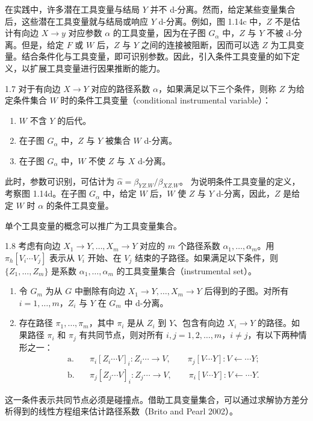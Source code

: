 在实践中，许多潜在工具变量与结局 $Y$ 并不 d-分离。然而，给定某些变量集合后，这些潜在工具变量就与结局或响应 $Y$ d-分离。例如，图 1.14c 中，$Z$ 不是估计有向边 $X\to y$ 对应参数 $\alpha$ 的工具变量，因为在子图 $G_\alpha$ 中，$Z$ 与 $Y$ 不被 d-分离。但是，给定 $F$ 或 $W$ 后，$Z$ 与 $Y$ 之间的连接被阻断，因而可以选 $Z$ 为工具变量。结合条件化与工具变量，即可识别参数。因此，引入条件工具变量的如下定义，以扩展工具变量进行因果推断的能力。

\begin{bookdefinition}{1.7}
对于有向边 $X\to Y$ 对应的路径系数 $\alpha$，如果满足以下三个条件，则称 $Z$ 为给定条件集合 $W$ 时的条件工具变量（conditional instrumental variable）：
\begin{enumerate}
\item $W$ 不含 $Y$ 的后代。
\item 在子图 $G_\alpha$ 中，$Z$ 与 $Y$ 被集合 $W$ d-分离。
\item 在子图 $G_\alpha$ 中，$W$ 不使 $Z$ 与 $X$ d-分离。
\end{enumerate}
此时，参数可识别，可估计为
$\widehat\alpha=\beta_{YZ.W}/\beta_{XZ.W}$。
为说明条件工具变量的定义，考察图 1.14d。在子图 $G_\alpha$ 中，给定 $W$ 后，$W$ 使 $Z$ 与 $Y$ d-分离，因此，$Z$ 是给定 $W$ 时 $\alpha$ 的条件工具变量。
\end{bookdefinition}

单个工具变量的概念可以推广为工具变量集合。

\begin{bookdefinition}{1.8}
考虑有向边 $X_1\to Y,\ldots,X_m\to Y$ 对应的 $m$ 个路径系数 $\alpha_1,\ldots,\alpha_m$。用 $\pi_h[V_i\cdots V_j]$ 表示从 $V_i$ 开始、在 $V_j$ 结束的子路径。如果满足以下条件，则 $\{Z_1,\ldots,Z_m\}$ 是系数 $\alpha_1,\ldots,\alpha_m$ 的工具变量集合（instrumental set）。
\begin{enumerate}
\item 令 $G_m$ 为从 $G$ 中删除有向边 $X_1\to Y,\ldots,X_m\to Y$ 后得到的子图。对所有 $i=1,\ldots,m$，$Z_i$ 与 $Y$ 在 $G_m$ 中 d-分离。
\item 存在路径 $\pi_1,\ldots,\pi_m$，其中 $\pi_i$ 是从 $Z_i$ 到 $Y$、包含有向边 $X_i\to Y$ 的路径。如果路径 $\pi_i$ 和 $\pi_j$ 有共同节点，则对所有 $i,j=1,2,\ldots,m$，$i\ne j$，有以下两种情形之一：
\[
\begin{aligned}
\text{a.}\quad&
\pi_i[Z_i\cdots V]_i:Z_i\cdots\to V,\qquad
\pi_j[V\cdots Y]:V\leftarrow\cdots Y;\\
\text{b.}\quad&
\pi_j[Z_j\cdots V]_i:Z_j\cdots\to V,\qquad
\pi_i[V\cdots Y]:V\leftarrow\cdots Y.
\end{aligned}
\]
\end{enumerate}
这一条件表示共同节点必须是碰撞点。借助工具变量集合，可以通过求解协方差分析得到的线性方程组来估计路径系数（Brito and Pearl 2002）。
\end{bookdefinition}

